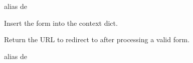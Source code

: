 \documentclass[letterpaper,10pt,spanish]{sphinxmanual}
\begin{document}
\begin{fulllineitems}

\pysigstartsignatures
{}
\pysigstopsignatures

\begin{fulllineitems}

\pysigstartsignatures
{}
\pysigstopsignatures
\sphinxAtStartPar
alias de 

\end{fulllineitems}



\begin{fulllineitems}

\pysigstartsignatures
{}
\pysigstopsignatures
\sphinxAtStartPar
Insert the form into the context dict.

\end{fulllineitems}



\begin{fulllineitems}

\pysigstartsignatures
{}
\pysigstopsignatures
\sphinxAtStartPar
Return the URL to redirect to after processing a valid form.

\end{fulllineitems}



\begin{fulllineitems}

\pysigstartsignatures
{}
\pysigstopsignatures
\sphinxAtStartPar
alias de 

\end{fulllineitems}



\begin{fulllineitems}

\pysigstartsignatures
{}
\pysigstopsignatures
\end{fulllineitems}


\end{fulllineitems}
\end{document}

